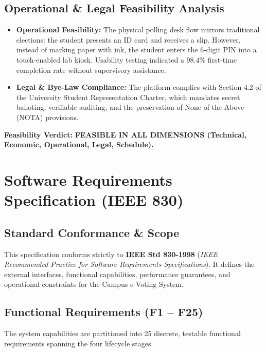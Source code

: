 \documentclass[12pt,a4paper,oneside]{report}
\begin{document}
\section{Operational \& Legal Feasibility Analysis}
\begin{itemize}
    \item \textbf{Operational Feasibility:} The physical polling desk flow mirrors traditional elections: the student presents an ID card and receives a slip. However, instead of marking paper with ink, the student enters the 6-digit PIN into a touch-enabled lab kiosk. Usability testing indicated a $98.4\%$ first-time completion rate without supervisory assistance.
    \item \textbf{Legal \& Bye-Law Compliance:} The platform complies with Section 4.2 of the University Student Representation Charter, which mandates secret balloting, verifiable auditing, and the preservation of None of the Above (NOTA) provisions.
\end{itemize}

\noindent \textbf{Feasibility Verdict:} \textbf{FEASIBLE IN ALL DIMENSIONS (Technical, Economic, Operational, Legal, Schedule).}

\chapter{Software Requirements Specification (IEEE 830)}
\label{chap:srs}

\section{Standard Conformance \& Scope}
This specification conforms strictly to \textbf{IEEE Std 830-1998} (\emph{IEEE Recommended Practice for Software Requirements Specifications}). It defines the external interfaces, functional capabilities, performance guarantees, and operational constraints for the Campus e-Voting System.

\section{Functional Requirements (F1 -- F25)}
The system capabilities are partitioned into 25 discrete, testable functional requirements spanning the four lifecycle stages.
\end{document}
